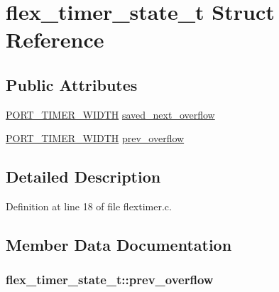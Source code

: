 \hypertarget{structflex__timer__state__t}{}\section{flex\+\_\+timer\+\_\+state\+\_\+t Struct Reference}
\label{structflex__timer__state__t}
\subsection*{Public Attributes}
\begin{DoxyCompactItemize}
\item 
\hyperlink{z1_2board__info_8h_abe66b9c1c60db84f2a99f2b827275f24}{P\+O\+R\+T\+\_\+\+T\+I\+M\+E\+R\+\_\+\+W\+I\+D\+TH} \hyperlink{structflex__timer__state__t_a2a7a15a453a986ce9837c0525ad9f742}{saved\+\_\+next\+\_\+overflow}
\item 
\hyperlink{z1_2board__info_8h_abe66b9c1c60db84f2a99f2b827275f24}{P\+O\+R\+T\+\_\+\+T\+I\+M\+E\+R\+\_\+\+W\+I\+D\+TH} \hyperlink{structflex__timer__state__t_a1dc6481cbaed774b5f60632af5497a76}{prev\+\_\+overflow}
\end{DoxyCompactItemize}


\subsection{Detailed Description}


Definition at line 18 of file flextimer.\+c.



\subsection{Member Data Documentation}
\subsubsection[{\texorpdfstring{prev\+\_\+overflow}{prev_overflow}}]{ flex\+\_\+timer\+\_\+state\+\_\+t\+::prev\+\_\+overflow}\hypertarget{structflex__timer__state__t_a1dc6481cbaed774b5f60632af5497a76}{}\label{structflex__timer__state__t_a1dc6481cbaed774b5f60632af5497a76}


